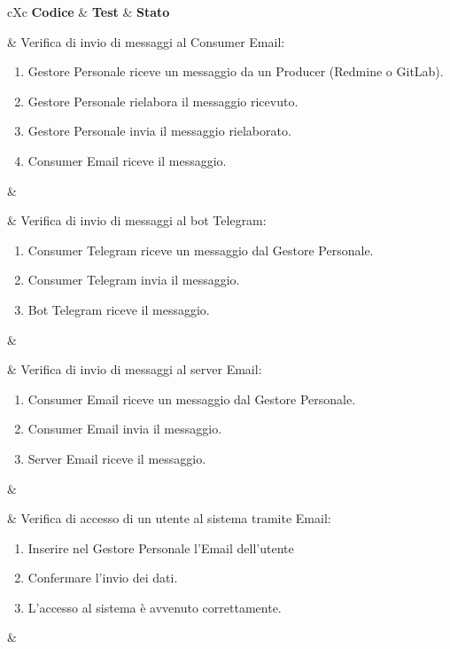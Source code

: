 \begin{table}[H]
	\begin{VTtable}[1.7]{\textwidth}{cXc}
		\rowcolor{\tablegray}
		\textbf{Codice} & \centering\textbf{Test} & \textbf{Stato} \\\toprule

        \addtotv & Verifica di invio di messaggi al Consumer Email:
        \begin{enumerate}
            \item Gestore Personale riceve un messaggio da un Producer (Redmine o GitLab).
            \item Gestore Personale rielabora il messaggio ricevuto.
            \item Gestore Personale invia il messaggio rielaborato.
            \item Consumer Email riceve il messaggio.
        \end{enumerate}
        & \TNI \\\midrule

        \addtotv & Verifica di invio di messaggi al bot Telegram:
        \begin{enumerate}
            \item Consumer Telegram riceve un messaggio dal Gestore Personale.
            \item Consumer Telegram invia il messaggio.
            \item Bot Telegram riceve il messaggio.
        \end{enumerate}
        & \TNI \\\midrule

        \addtotv & Verifica di invio di messaggi al server Email:
        \begin{enumerate}
            \item Consumer Email riceve un messaggio dal Gestore Personale.
            \item Consumer Email invia il messaggio.
            \item Server Email riceve il messaggio.
        \end{enumerate}
        & \TNI \\\midrule

        \addtotv & Verifica di accesso di un utente al sistema tramite Email:
        \begin{enumerate}
            \item Inserire nel Gestore Personale l'Email dell'utente
            \item Confermare l'invio dei dati.
            \item L'accesso al sistema è avvenuto correttamente.
        \end{enumerate}
        & \TNI \\\midrule


\end{VTtable}
\end{table}
